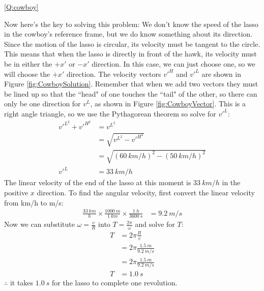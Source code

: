 \begin{solution}{\ref{Q:cowboy}}
{\begin{enumerate}[label=\alph*)]
Now here's the key to solving this problem: We don't know the speed of the lasso in the cowboy's reference frame, but we do know something about its direction. Since the motion of the lasso is circular, its velocity must be tangent to the circle. This means that when the lasso is directly in front of the hawk, its velocity must be in either the $+x'$ or $-x'$ direction. In this case, we can just choose one, so we will choose the $+x'$ direction.
The velocity vectors $v'^H$ and $v'^L$ are shown in Figure \ref{fig:CowboySolution}. Remember that when we add two vectors they must be lined up so that the ``head" of one touches the ``tail" of the other, so there can only be one direction for $v^L$, as shown in Figure \ref{fig:CowboyVector}. 
This is a right angle triangle, so we use the Pythagorean theorem so solve for $v'^L$:
\begin{align*}
v'^{L^2}+v'^{H^2}&=v^{L^2}\\
&=\sqrt{v^{L^2}-v'^{H^2}}\\
&=\sqrt{(\SI{60}{km/h})^2-(\SI{50}{km/h})^2}\\
v'^L&=\SI{33}{km/h}
\end{align*}
The linear velocity of the end of the lasso at this moment is $\SI{33}{km/h}$ in the positive $x$ direction.  To find the angular velocity, first convert the linear velocity from km/h to m/s:
\begin{align*}
\frac{\SI{33}{km}}{h}\times \frac{\SI{1000}{m}}{\SI{1}{km}} \times \frac{\SI{1}{h}}{\SI{3600}{s}} &= \SI{9.2}{m/s}
\end{align*}     
Now we can substitute $\omega=\frac{v}{R}$ into $T=\frac{2\pi}{\omega}$ and solve for $T$:
\begin{align*}
T&={2\pi}\frac{R}{v}\\
&={2\pi}\frac{\SI{1.5}{m}}{\SI{9.2}{m/s}}\\
&={2\pi}\frac{\SI{1.5}{m}}{\SI{9.2}{m/s}}\\
T&=\SI{1.0}{s}
\end{align*}
$\therefore$ it takes $\SI{1.0}{s}$ for the lasso to complete one revolution.

\end{enumerate}}
\end{solution}
